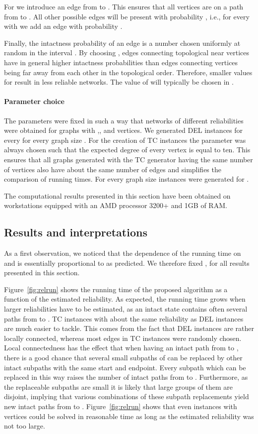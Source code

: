 \documentclass{article}
\begin{document}
For  we introduce an edge from  to . This
ensures that all vertices are on a path from  to .
All other possible edges will be present
with probability , i.e., for every  with 
we add an edge  with probability .

Finally, the intactness probability of an edge  is a number chosen
uniformly at random in the interval . By choosing
, edges connecting topological near vertices have in general higher
intactness probabilities than edges connecting vertices being far away from each
other in the topological order. Therefore, smaller values for 
result in less reliable networks. The value of  will typically be
chosen in .

\paragraph{Parameter choice}

The parameters were fixed in such a way that networks of different reliabilities
were obtained for graphs with ,, and  vertices.
We generated DEL instances
for every
 for every graph size .
For the creation of TC instances
the parameter  was always chosen such that the expected degree of
every vertex is equal to ten. This ensures that all graphs generated with the TC
generator having the same number of vertices also have about the same number of edges
and simplifies the comparison of running times. For every graph size 
instances were generated for .

The computational results presented in this section have been obtained on workstations
equipped with an AMD processor 3200+ and 1GB of RAM.

\subsection{Results and interpretations}

As a first observation, we noticed that the dependence of the running time
on  and  is essentially proportional to
 as predicted. We therefore
fixed ,  for all results presented in this section.

Figure~\ref{fig:relrun} shows the running time
of the proposed algorithm as a function of the estimated reliability. As
expected, the running time grows when larger reliabilities have to be estimated,
as an intact state contains often several paths from  to . TC instances
with about the same reliability as DEL instances are much easier to tackle.
This comes from the fact that DEL instances are rather locally connected,
whereas most edges in TC instances were randomly chosen. Local connectedness
has the effect that when having an intact path  from  to , there is
a good chance that several small subpaths of  can be replaced by other intact
subpaths with the same start and endpoint. Every subpath which can be replaced
in this way raises the number of intact paths from  to . Furthermore, as
the replaceable subpaths are small it is likely that large groups of them are
disjoint, implying that various combinations of these subpath replacements
yield new intact paths from  to .
Figure~\ref{fig:relrun} shows that
even instances with  vertices could be solved in reasonable time
as long as the estimated reliability was not too large.
\end{document}

